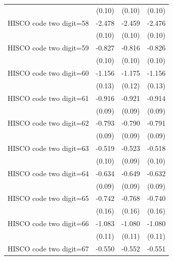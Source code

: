 {\begin{tabular}{l*{3}{c}}
                    &      (0.10)         &      (0.10)         &      (0.10)         \\
HISCO code two digit=58&      -2.478\sym{***}&      -2.459\sym{***}&      -2.476\sym{***}\\
                    &      (0.10)         &      (0.10)         &      (0.10)         \\
HISCO code two digit=59&      -0.827\sym{***}&      -0.816\sym{***}&      -0.826\sym{***}\\
                    &      (0.10)         &      (0.10)         &      (0.10)         \\
HISCO code two digit=60&      -1.156\sym{***}&      -1.175\sym{***}&      -1.156\sym{***}\\
                    &      (0.13)         &      (0.12)         &      (0.13)         \\
HISCO code two digit=61&      -0.916\sym{***}&      -0.921\sym{***}&      -0.914\sym{***}\\
                    &      (0.09)         &      (0.09)         &      (0.09)         \\
HISCO code two digit=62&      -0.793\sym{***}&      -0.790\sym{***}&      -0.791\sym{***}\\
                    &      (0.09)         &      (0.09)         &      (0.09)         \\
HISCO code two digit=63&      -0.519\sym{***}&      -0.523\sym{***}&      -0.518\sym{***}\\
                    &      (0.10)         &      (0.09)         &      (0.10)         \\
HISCO code two digit=64&      -0.634\sym{***}&      -0.649\sym{***}&      -0.632\sym{***}\\
                    &      (0.09)         &      (0.09)         &      (0.09)         \\
HISCO code two digit=65&      -0.742\sym{***}&      -0.768\sym{***}&      -0.740\sym{***}\\
                    &      (0.16)         &      (0.16)         &      (0.16)         \\
HISCO code two digit=66&      -1.083\sym{***}&      -1.080\sym{***}&      -1.080\sym{***}\\
                    &      (0.11)         &      (0.11)         &      (0.11)         \\
HISCO code two digit=67&      -0.550\sym{**} &      -0.552\sym{**} &      -0.551\sym{**} \\

\end{tabular}}
